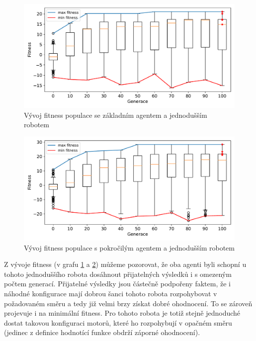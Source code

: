 \begin{figure}[h!]
    \centering
    \includegraphics[width=1\textwidth]{../img/experiment1_2_Sine_10ticks.pdf}
    \caption{Vývoj fitness populace se základním agentem a jednodušším robotem}
    \label{exp:first2_sinefull}
\end{figure}
\begin{figure}[h!]
    \includegraphics[width=1\textwidth]{../img/experiment1_2_TFS_10ticks.pdf}
    \caption{Vývoj fitness populace s pokročilým agentem a jednodušším robotem}
    \label{exp:first2_TFS}
\end{figure}

\pagebreak
Z vývoje fitness (v grafu \ref{exp:first2_sinefull} a \ref{exp:first2_TFS})
můžeme pozorovat, že oba agenti byli schopní u tohoto jednoduššího robota
dosáhnout přijatelných výsledků i s omezeným počtem generací. Přijatelné
výsledky jsou částečně podpořeny faktem, že i náhodné konfigurace mají dobrou
šanci tohoto robota rozpohybovat v požadovaném směru a tedy již velmi brzy
získat dobré ohodnocení. To se zároveň projevuje i na minimální fitness. Pro
tohoto robota je totiž stejně jednoduché dostat takovou konfiguraci motorů,
které ho rozpohybují v opačném směru (jedinec z definice hodnotící funkce
obdrží záporné ohodnocení).

